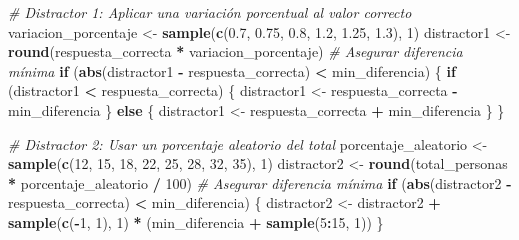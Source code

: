 \documentclass[
]{article}
\newenvironment{Shaded}{\begin{snugshade}}{\end{snugshade}}
\newcommand{\CommentTok}[1]{\textcolor[rgb]{0.56,0.35,0.01}{\textit{#1}}}
\newcommand{\ControlFlowTok}[1]{\textcolor[rgb]{0.13,0.29,0.53}{\textbf{#1}}}
\newcommand{\DecValTok}[1]{\textcolor[rgb]{0.00,0.00,0.81}{#1}}
\newcommand{\FloatTok}[1]{\textcolor[rgb]{0.00,0.00,0.81}{#1}}
\newcommand{\FunctionTok}[1]{\textcolor[rgb]{0.13,0.29,0.53}{\textbf{#1}}}
\newcommand{\NormalTok}[1]{#1}
\newcommand{\OtherTok}[1]{\textcolor[rgb]{0.56,0.35,0.01}{#1}}
\newcommand{\SpecialCharTok}[1]{\textcolor[rgb]{0.81,0.36,0.00}{\textbf{#1}}}
\begin{document}
\begin{Shaded}
\begin{Highlighting}[]
\CommentTok{\# Distractor 1: Aplicar una variación porcentual al valor correcto}
\NormalTok{variacion\_porcentaje }\OtherTok{\textless{}{-}} \FunctionTok{sample}\NormalTok{(}\FunctionTok{c}\NormalTok{(}\FloatTok{0.7}\NormalTok{, }\FloatTok{0.75}\NormalTok{, }\FloatTok{0.8}\NormalTok{, }\FloatTok{1.2}\NormalTok{, }\FloatTok{1.25}\NormalTok{, }\FloatTok{1.3}\NormalTok{), }\DecValTok{1}\NormalTok{)}
\NormalTok{distractor1 }\OtherTok{\textless{}{-}} \FunctionTok{round}\NormalTok{(respuesta\_correcta }\SpecialCharTok{*}\NormalTok{ variacion\_porcentaje)}
\CommentTok{\# Asegurar diferencia mínima}
\ControlFlowTok{if}\NormalTok{ (}\FunctionTok{abs}\NormalTok{(distractor1 }\SpecialCharTok{{-}}\NormalTok{ respuesta\_correcta) }\SpecialCharTok{\textless{}}\NormalTok{ min\_diferencia) \{}
  \ControlFlowTok{if}\NormalTok{ (distractor1 }\SpecialCharTok{\textless{}}\NormalTok{ respuesta\_correcta) \{}
\NormalTok{    distractor1 }\OtherTok{\textless{}{-}}\NormalTok{ respuesta\_correcta }\SpecialCharTok{{-}}\NormalTok{ min\_diferencia}
\NormalTok{  \} }\ControlFlowTok{else}\NormalTok{ \{}
\NormalTok{    distractor1 }\OtherTok{\textless{}{-}}\NormalTok{ respuesta\_correcta }\SpecialCharTok{+}\NormalTok{ min\_diferencia}
\NormalTok{  \}}
\NormalTok{\}}

\CommentTok{\# Distractor 2: Usar un porcentaje aleatorio del total}
\NormalTok{porcentaje\_aleatorio }\OtherTok{\textless{}{-}} \FunctionTok{sample}\NormalTok{(}\FunctionTok{c}\NormalTok{(}\DecValTok{12}\NormalTok{, }\DecValTok{15}\NormalTok{, }\DecValTok{18}\NormalTok{, }\DecValTok{22}\NormalTok{, }\DecValTok{25}\NormalTok{, }\DecValTok{28}\NormalTok{, }\DecValTok{32}\NormalTok{, }\DecValTok{35}\NormalTok{), }\DecValTok{1}\NormalTok{)}
\NormalTok{distractor2 }\OtherTok{\textless{}{-}} \FunctionTok{round}\NormalTok{(total\_personas }\SpecialCharTok{*}\NormalTok{ porcentaje\_aleatorio }\SpecialCharTok{/} \DecValTok{100}\NormalTok{)}
\CommentTok{\# Asegurar diferencia mínima}
\ControlFlowTok{if}\NormalTok{ (}\FunctionTok{abs}\NormalTok{(distractor2 }\SpecialCharTok{{-}}\NormalTok{ respuesta\_correcta) }\SpecialCharTok{\textless{}}\NormalTok{ min\_diferencia) \{}
\NormalTok{  distractor2 }\OtherTok{\textless{}{-}}\NormalTok{ distractor2 }\SpecialCharTok{+} \FunctionTok{sample}\NormalTok{(}\FunctionTok{c}\NormalTok{(}\SpecialCharTok{{-}}\DecValTok{1}\NormalTok{, }\DecValTok{1}\NormalTok{), }\DecValTok{1}\NormalTok{) }\SpecialCharTok{*}\NormalTok{ (min\_diferencia }\SpecialCharTok{+} \FunctionTok{sample}\NormalTok{(}\DecValTok{5}\SpecialCharTok{:}\DecValTok{15}\NormalTok{, }\DecValTok{1}\NormalTok{))}
\NormalTok{\}}


\end{Highlighting}
\end{Shaded}
\end{document}
